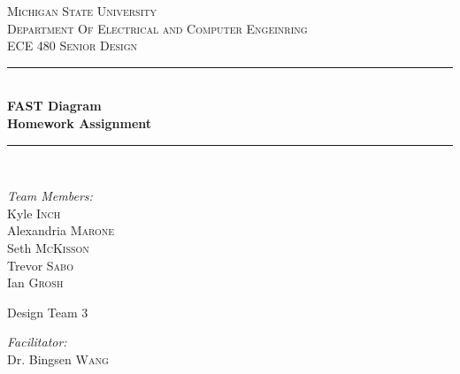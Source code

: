 \begin{titlepage}
		             
		\newcommand{\HRule}{\rule{\linewidth}{0.5mm}} %
		
		\center %
		
		
		\textsc{\LARGE Michigan State University}\\[0.5cm] %
		\textsc{\Large Department Of Electrical and Computer Engeinring}\\[0.5cm] %
		\textsc{\Large ECE 480 Senior Design}\\[0.5cm]
		
		
		\HRule \\[0.2cm]
		{ \huge \bfseries FAST Diagram \\ Homework Assignment }\\[0.2cm] %
		\HRule \\[1.5cm]
		
		\noindent
		\begin{minipage}[t]{0.3\textwidth}
			\begin{flushleft} \large
				\emph{Team Members:}\\
				Kyle \textsc{Inch}\\
				Alexandria \textsc{Marone}\\
				Seth \textsc{McKisson}\\
				Trevor \textsc{Sabo}\\
				Ian \textsc{Grosh}\\ %
			\end{flushleft}
		\end{minipage}%
		\begin{minipage}{0.3\textwidth}
			\centering
			{\LARGE Design Team 3}
		\end{minipage}
		\begin{minipage}[t]{0.3\textwidth}
			\begin{flushright} \large
				\emph{Facilitator:}\\  %
				Dr. Bingsen \textsc{Wang}
				

\end{flushright}
\end{minipage}
\end{titlepage}
